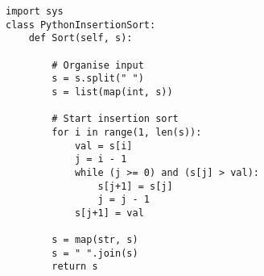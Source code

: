 	\lstset{style=python}
	\begin{lstlisting}
import sys
class PythonInsertionSort:
    def Sort(self, s):

        # Organise input
        s = s.split(" ")
        s = list(map(int, s))
        
        # Start insertion sort
        for i in range(1, len(s)):
            val = s[i]
            j = i - 1
            while (j >= 0) and (s[j] > val):
                s[j+1] = s[j]
                j = j - 1
            s[j+1] = val

        s = map(str, s)
        s = " ".join(s)
        return s
	\end{lstlisting}
